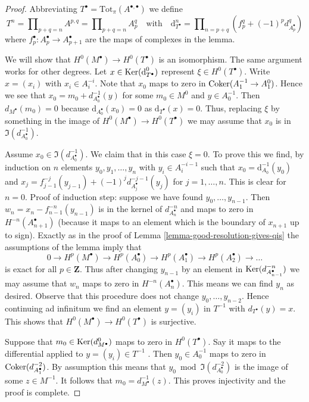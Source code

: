 \begin{proof}
Abbreviating $T^\bullet = \text{Tot}_\pi(A^{\bullet, \bullet})$
we define
$$
T^n = \prod\nolimits_{p + q = n} A^{p, q} =
\prod\nolimits_{p + q = n} A_p^q
\quad\text{with}\quad
\text{d}_{T^\bullet}^n =
\prod\nolimits_{n = p + q} (f_p^q + (-1)^pd_{A_p^\bullet}^q)
$$
where $f_p^\bullet : A_p^\bullet \to A_{p + 1}^\bullet$
are the maps of complexes in the lemma.

\medskip\noindent
We will show that $H^0(M^\bullet) \to H^0(T^\bullet)$ is an isomorphism.
The same argument works for other degrees.
Let $x \in \mathop{\mathrm{Ker}}(\text{d}_{T^\bullet}^0)$ represent $\xi \in H^0(T^\bullet)$.
Write $x = (x_i)$ with $x_i \in A_i^{-i}$.
Note that $x_0$ maps to zero in $\mathop{\mathrm{Coker}}(A_1^{-1} \to A_1^0)$.
Hence we see that $x_0 = m_0 + d_{A_0^\bullet}^{-1}(y)$ for some
$m_0 \in M^0$ and $y \in A_0^{-1}$.
Then $d_{M^\bullet}(m_0) = 0$ because $\text{d}_{A_0^\bullet}(x_0) = 0$
as $\text{d}_{T^\bullet}(x) = 0$.
Thus, replacing $\xi$ by something in the image of
$H^0(M^\bullet) \to H^0(T^\bullet)$ we may assume that $x_0$
is in $\Im(d^{-1}_{A_0^\bullet})$.

\medskip\noindent
Assume $x_0 \in \Im(d^{-1}_{A_0^\bullet})$. We claim that in this
case $\xi = 0$. To prove this we find, by induction on $n$ elements
$y_0, y_1, \ldots, y_n$ with $y_i \in A_i^{-i - 1}$ such that
$x_0 = \text{d}_{A_0}^{-1}(y_0)$ and
$x_j = f_{j - 1}^{-j}(y_{j - 1}) + (-1)^j d^{-j - 1}_{A_j^\bullet}(y_j)$
for $j = 1, \ldots, n$. This is clear for $n = 0$. Proof of induction step:
suppose we have found $y_0, \ldots, y_{n - 1}$. Then
$w_n = x_n - f_{n - 1}^{-n}(y_{n - 1})$ is in the kernel of
$d^{-n}_{A_n^\bullet}$ and maps to zero in $H^{-n}(A_{n + 1}^\bullet)$
(because it maps to an element which is the boundary
of $x_{n + 1}$ up to sign). Exactly as in the proof of
Lemma \ref{lemma-good-resolution-gives-qis}
the assumptions of the lemma imply that
$$
0 \to
H^p(M^\bullet) \to
H^p(A_0^\bullet) \to
H^p(A_1^\bullet) \to
H^p(A_2^\bullet) \to \ldots
$$
is exact for all $p \in \mathbf{Z}$. Thus after changing $y_{n - 1}$
by an element in $\mathop{\mathrm{Ker}}(d^{-n}_{A_{n - 1}^\bullet})$ we may assume
that $w_n$ maps to zero in $H^{-n}(A_n^\bullet)$. This means we
can find $y_n$ as desired. Observe that this procedure does not
change $y_0, \ldots, y_{n - 2}$. Hence continuing ad infinitum
we find an element $y = (y_i)$ in $T^{-1}$ with $d_{T^\bullet}(y) = x$.
This shows that $H^0(M^\bullet) \to H^0(T^\bullet)$ is surjective.

\medskip\noindent
Suppose that $m_0 \in \mathop{\mathrm{Ker}}(d^0_{M^\bullet})$ maps to zero in $H^0(T^\bullet)$.
Say it maps to the differential applied to $y = (y_i) \in T^{-1}$ .
Then $y_0 \in A_0^{-1}$ maps to zero in $\mathop{\mathrm{Coker}}(d^{-2}_{A_1^\bullet})$.
By assumption this means that $y_0 \bmod \Im(d^{-2}_{A_0^\bullet})$
is the image of some $z \in M^{-1}$. It follows that
$m_0 = d^{-1}_{M^\bullet}(z)$. This proves injectivity and the proof is
complete.
\end{proof}

